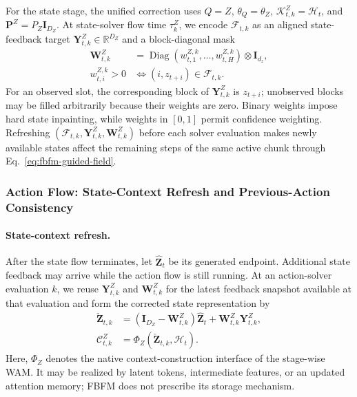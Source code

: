 For the state stage, the unified correction uses
$Q=Z$, $\theta_Q=\theta_Z$,
$\mathcal K_{t,k}^Z=\mathcal H_t$, and
$\mathbf P^Z=P_Z\mathbf I_{D_Z}$. At state-solver flow time
$\tau_k^Z$, we encode $\mathcal F_{t,k}$ as an aligned state-feedback target
$\mathbf Y_{t,k}^Z\in\mathbb R^{D_Z}$ and a block-diagonal mask
\begin{equation}
    \begin{aligned}
    \mathbf W_{t,k}^Z
    &=
    \operatorname{Diag}
    \!\left(w_{t,1}^{Z,k},\ldots,w_{t,H}^{Z,k}\right)
    \otimes\mathbf I_{d_z},\\
    w_{t,i}^{Z,k}>0
    &\Longleftrightarrow
    (i,z_{t+i})\in\mathcal F_{t,k}.
    \end{aligned}
    \label{eq:dynamic-state-mask}
\end{equation}
For an observed slot, the corresponding block of $\mathbf Y_{t,k}^Z$ is
$z_{t+i}$; unobserved blocks may be filled arbitrarily because their weights are
zero. Binary weights impose hard state inpainting, while weights in $[0,1]$
permit confidence weighting. Refreshing $(\mathcal F_{t,k},\mathbf Y_{t,k}^Z,
\mathbf W_{t,k}^Z)$ before each solver evaluation makes newly available states
affect the remaining steps of the same active chunk through
Eq.~\eqref{eq:fbfm-guided-field}.

\subsubsection{Action Flow: State-Context Refresh and Previous-Action Consistency}

\paragraph{State-context refresh.}

After the state flow terminates, let $\hat{\mathbf Z}_t$ be its generated endpoint.
Additional state feedback may arrive while the action flow is still running. At an
action-solver evaluation $k$, we reuse $\mathbf Y_{t,k}^Z$ and
$\mathbf W_{t,k}^Z$ for the latest feedback snapshot available at that evaluation
and form the corrected state representation by
\begin{equation}
    \begin{aligned}
    \check{\mathbf Z}_{t,k}
    &=\left(\mathbf I_{D_Z}-\mathbf W_{t,k}^Z\right)\hat{\mathbf Z}_t
      +\mathbf W_{t,k}^Z\mathbf Y_{t,k}^Z,\\
    \mathcal C_{t,k}^Z
    &=\Phi_Z(\check{\mathbf Z}_{t,k},\mathcal H_t).
    \end{aligned}
    \label{eq:state-context-refresh}
\end{equation}
Here, $\Phi_Z$ denotes the native context-construction interface of the stage-wise
WAM. It may be realized by latent tokens, intermediate features, or an updated
attention memory; FBFM does not prescribe its storage mechanism.

